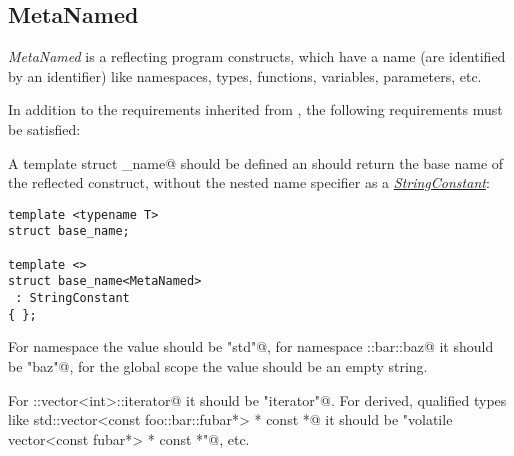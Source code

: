 \subsection{MetaNamed}
\label{concept-MetaNamed}

{\em MetaNamed} is a  reflecting program constructs, which have a name
(are identified by an identifier) like namespaces, types, functions, variables, parameters, etc.

In addition to the requirements inherited from , the following requirements must
be satisfied:

A template struct \verb@base_name@ should be defined an should return the base name
of the reflected construct, without the nested name specifier as a
\hyperref[concept-StringConstant]{\em StringConstant}:

\begin{lstlisting}
template <typename T>
struct base_name;

template <>
struct base_name<MetaNamed>
 : StringConstant
{ };
\end{lstlisting}

For namespace \verb@std@ the value should be \verb@"std"@, for namespace
\verb@foo::bar::baz@ it should be \verb@"baz"@, for the global scope the
value should be an empty string.

For \verb@std::vector<int>::iterator@ it should be \verb@"iterator"@. For derived,
qualified types like \verb@volatile std::vector<const foo::bar::fubar*> * const *@
it should be \verb@"volatile vector<const fubar*> * const *"@, etc.

